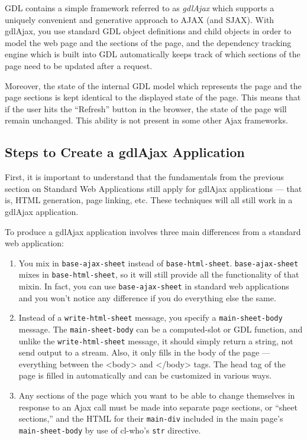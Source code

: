 \documentclass [11pt]{book}
\begin{document}
GDL contains a simple framework referred to as \emph{gdlAjax} which supports a uniquely convenient and generative
approach to AJAX (and SJAX). With gdlAjax, you use standard GDL
object definitions and child objects in order to model the web page
and the sections of the page, and the dependency tracking engine which
is built into GDL automatically keeps track of which sections of the
page need to be updated after a request.



Moreover, the state of the internal GDL model which
represents the page and the page sections is kept identical to the
displayed state of the page. This means that if the user hits the
``Refresh'' button in the browser, the state of the page will remain
unchanged. This ability is not present in some other Ajax
frameworks.



\subsection{Steps to Create a gdlAjax Application}

\label{subsec:stepstocreateagdlajaxapplication}



First, it is important to understand that the fundamentals from the
previous section on Standard Web Applications still apply for gdlAjax
applications --- that is, HTML generation, page linking, etc. These
techniques will all still work in a gdlAjax application.



To produce a gdlAjax application involves three main differences from
a standard web application:

\begin{enumerate}

\item You mix in \texttt{base-ajax-sheet} instead of \texttt{base-html-sheet}. \texttt{base-ajax-sheet} mixes in \texttt{base-html-sheet}, so it will still provide all the functionality of that
   mixin. In fact, you can use \texttt{base-ajax-sheet} in standard web applications and you won't notice any difference if you do
    everything else the same.

\item Instead of a \texttt{write-html-sheet} message, you specify a \texttt{main-sheet-body} message. The \texttt{main-sheet-body}  can be a computed-slot or GDL function,
    and unlike the \texttt{write-html-sheet} message, it should
    simply return a string, not send output to a stream. Also, it only
    fills in the body of the page --- everything between the <body>
    and </body> tags. The head tag of the page is filled in
    automatically and can be customized in various ways.

\item Any sections of the page which you want to be able
      to change themselves in response to an Ajax call must be made
      into separate page sections, or ``sheet sections,'' and the HTML
      for their \texttt{main-div} included in the main page's \texttt{main-sheet-body} by use of cl-who's \texttt{str} directive.

\end{enumerate}
\end{document}

